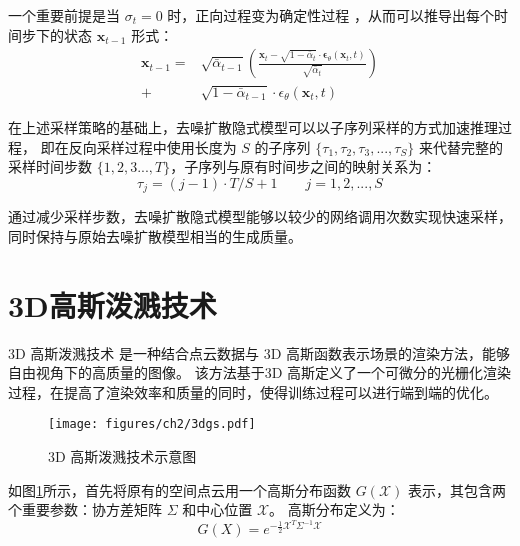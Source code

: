 一个重要前提是当 $\sigma_t=0$ 时，正向过程变为确定性过程 \cite{ddim}，从而可以推导出每个时间步下的状态 $\mathbf{x}_{t-1}$ 形式：
\begin{equation}
\begin{split}
     \mathbf{x}_{t-1} =& \sqrt{\bar{\alpha}_{t-1}}\left(\frac{\mathbf{x}_t-\sqrt{1-\bar{\alpha}_t} \cdot \boldsymbol{\epsilon}_\theta\left(\mathbf{x}_t, t\right)}{\sqrt{\bar{\alpha}_t}}\right) \\
     + &\sqrt{1-\bar{\alpha}_{t-1}} \cdot \epsilon_\theta\left(\mathbf{x}_t, t\right)
\end{split}
\end{equation}

在上述采样策略的基础上，去噪扩散隐式模型可以以子序列采样的方式加速推理过程，
即在反向采样过程中使用长度为 $S$ 的子序列 $\{\tau_1, \tau_2, \tau_3, ..., \tau_S\}$ 来代替完整的采样时间步数 $\{1,2,3..., T\}$，子序列与原有时间步之间的映射关系为：
\begin{equation}
    \tau_j=(j-1) \cdot T / S+1  \quad\quad j=1,2,...,S 
\end{equation}

通过减少采样步数，去噪扩散隐式模型能够以较少的网络调用次数实现快速采样，同时保持与原始去噪扩散模型相当的生成质量。


\section{3D高斯泼溅技术}
3D 高斯泼溅技术 \cite{3DGS} 是一种结合点云数据与 3D 高斯函数表示场景的渲染方法，能够自由视角下的高质量的图像。
该方法基于3D 高斯定义了一个可微分的光栅化渲染过程，在提高了渲染效率和质量的同时，使得训练过程可以进行端到端的优化。

\begin{figure}
    \centering
    \texttt{[image: figures/ch2/3dgs.pdf]}
    \caption{3D 高斯泼溅技术示意图}
    \label{img:3dgs}
\end{figure}

如图\ref{img:3dgs}所示，首先将原有的空间点云用一个高斯分布函数 $G(\mathcal{X})$ 表示，其包含两个重要参数：协方差矩阵 $\Sigma$ 和中心位置 $\mathcal{X}$。
高斯分布定义为：
\begin{equation}
\label{formula:gaussian's formula}
    G(X)=e^{-\frac{1}{2}\mathcal{X}^T\Sigma^{-1}\mathcal{X}}
\end{equation}

